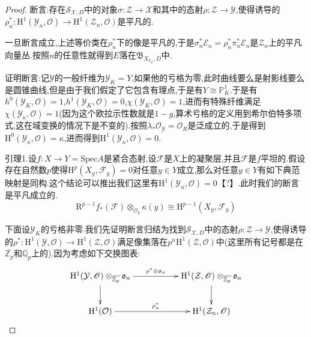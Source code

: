 \begin{enumerate}
\begin{proof}
        \qquad
        
        断言:存在$\mathcal{S}_{\mathcal{X},D}$中的对象$\sigma:\mathcal{Z}\to\mathcal{X}$和其中的态射$\rho:\mathcal{Z}\to\mathcal{Y}$,使得诱导的$\rho_n^*:\mathrm{H}^1(\mathcal{Y}_n,\mathscr{O})\to\mathrm{H}^1(\mathcal{Z}_n,\mathscr{O})$是平凡的.
        
        \qquad
        
        一旦断言成立,上述等价类在$\rho_n^*$下的像是平凡的,于是$\sigma_n^*\mathcal{E}_n=\rho_n^*\pi_n^*\mathcal{E}_n$是$\mathcal{Z}_n$上的平凡向量丛.按照$n$的任意性就得到$E$落在$\mathfrak{B}_{X_{\mathbb{C}_p},D}$中.
        
        \qquad
        
        证明断言:记$\mathcal{Y}$的一般纤维为$\mathcal{Y}_K=Y$,如果他的亏格为零,此时曲线要么是射影线要么是圆锥曲线,但是由于我们假定了它包含有理点,于是有$Y\cong\mathbb{P}^1_K$.于是有$h^0(\mathcal{Y}_K,\mathscr{O})=1$,$h^1(\mathcal{Y}_K,\mathscr{O})=0$,$\chi(\mathcal{Y}_K,\mathscr{O})=1$,进而有特殊纤维满足$\chi(\mathcal{Y}_{\kappa},\mathscr{O})=1$(因为这个欧拉示性数就是$1-g$,算术亏格的定义用到希尔伯特多项式,这在域变换的情况下是不变的).按照$\lambda_*\mathscr{O}_{\mathcal{Y}}=\mathscr{O}_R$是泛成立的,于是得到$\mathrm{H}^0(\mathcal{Y}_{\kappa},\mathscr{O})=\kappa$,进而得到$\mathrm{H}^1(\mathcal{Y}_{\kappa},\mathscr{O})=0$.
        
        \qquad
        
        引理1.设$f:X\to Y=\mathrm{Spec}A$是紧合态射,设$\mathscr{F}$是$X$上的凝聚层,并且$\mathscr{F}$是$f$平坦的.假设存在自然数$p$使得$\mathrm{H}^p(X_y,\mathscr{F}_y)=0$对任意$y\in Y$成立,那么对任意$y\in Y$有如下典范映射是同构.这个结论可以推出我们这里有$\mathrm{H}^1(\mathcal{Y}_n,\mathscr{O})=0$【?】.此时我们的断言是平凡成立的.
        $$\mathrm{R}^{p-1}f_*(\mathscr{F})\otimes_{\mathscr{O}_y}\kappa(y)\cong\mathrm{H}^{p-1}(X_y,\mathscr{F}_y)$$
        
        \qquad
        
        下面设$\mathcal{Y}_K$的亏格非零.我们先证明断言归结为找到$\mathscr{S}_{\mathcal{X},D}$中的态射$\rho:\mathcal{Z}\to\mathcal{Y}$,使得诱导的$\rho^*:\mathrm{H}^1(\mathcal{Y},\mathscr{O})\to\mathrm{H}^1(\mathcal{Z},\mathscr{O})$满足像集落在$p^n\mathrm{H}^1(\mathcal{Z},\mathscr{O})$中(这里所有记号都是在$\overline{\mathbb{Z}_p}$和$\overline{\mathbb{Q}_p}$上的).因为考虑如下交换图表:
        $$\xymatrix{\mathrm{H}^1(\mathcal{Y},\mathscr{O})\otimes_{\overline{\mathbb{Z}_p}}\mathfrak{o}_n\ar[rr]^{\rho^*\otimes\mathfrak{o}_n}\ar[d]&&\mathrm{H}^1(\mathcal{Z},\mathscr{O})\otimes_{\overline{\mathbb{Z}_p}}\mathfrak{o}_n\ar[d]\\\mathrm{H}^1(\mathcal{O})\ar[rr]^{\rho_n^*}&&\mathrm{H}^1(\mathcal{Z}_n,\mathscr{O})}$$
        

\end{proof}
\end{enumerate}
